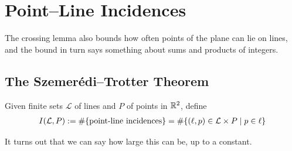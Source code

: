 \section{Point--Line Incidences}

The crossing lemma also bounds how often points of the plane can lie on lines, and the bound in turn says something about sums and products of integers.

\subsection{The Szemer\'{e}di--Trotter Theorem}

Given finite sets $\mathcal{L}$ of lines and $P$ of points in $\mathbb{R}^2$, define
\begin{align*}
    I\!\left( \mathcal{L}, P \right)
    := \#\!\left\{ \text{point-line incidences} \right\}
    = \#\!\left\{ \left( \ell, p \right) \in \mathcal{L} \times P \; \middle\vert \; p \in \ell \right\}
\end{align*}

It turns out that we can say how large this can be, up to a constant.

